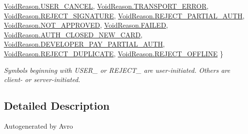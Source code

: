 \begin{DoxyCompactItemize}
\hyperlink{namespacecom_1_1clover_1_1sdk_1_1v3_1_1order_acb5aac0c1f6aeeb5b636223a69d2dec2a59a532f4ef332d10fde273cc7ff4fd14}{Void\+Reason.\+U\+S\+E\+R\+\_\+\+C\+A\+N\+C\+EL}, 
\hyperlink{namespacecom_1_1clover_1_1sdk_1_1v3_1_1order_acb5aac0c1f6aeeb5b636223a69d2dec2aaadf556bd097b61c56920ef42829167a}{Void\+Reason.\+T\+R\+A\+N\+S\+P\+O\+R\+T\+\_\+\+E\+R\+R\+OR}, 
\hyperlink{namespacecom_1_1clover_1_1sdk_1_1v3_1_1order_acb5aac0c1f6aeeb5b636223a69d2dec2a1e9802c7cfdc4f5719f7ce1ae4f3344e}{Void\+Reason.\+R\+E\+J\+E\+C\+T\+\_\+\+S\+I\+G\+N\+A\+T\+U\+RE}, 
\hyperlink{namespacecom_1_1clover_1_1sdk_1_1v3_1_1order_acb5aac0c1f6aeeb5b636223a69d2dec2ad58b4f3e400534658888b0ee3d905924}{Void\+Reason.\+R\+E\+J\+E\+C\+T\+\_\+\+P\+A\+R\+T\+I\+A\+L\+\_\+\+A\+U\+TH}, 
\newline
\hyperlink{namespacecom_1_1clover_1_1sdk_1_1v3_1_1order_acb5aac0c1f6aeeb5b636223a69d2dec2afc0938508402cc60d432d5912ebe6588}{Void\+Reason.\+N\+O\+T\+\_\+\+A\+P\+P\+R\+O\+V\+ED}, 
\hyperlink{namespacecom_1_1clover_1_1sdk_1_1v3_1_1order_acb5aac0c1f6aeeb5b636223a69d2dec2ab9e14d9b2886bcff408b85aefa780419}{Void\+Reason.\+F\+A\+I\+L\+ED}, 
\hyperlink{namespacecom_1_1clover_1_1sdk_1_1v3_1_1order_acb5aac0c1f6aeeb5b636223a69d2dec2ab97459783cb349a6b29deb91651f5489}{Void\+Reason.\+A\+U\+T\+H\+\_\+\+C\+L\+O\+S\+E\+D\+\_\+\+N\+E\+W\+\_\+\+C\+A\+RD}, 
\hyperlink{namespacecom_1_1clover_1_1sdk_1_1v3_1_1order_acb5aac0c1f6aeeb5b636223a69d2dec2aa1d8c654f447ed4f3111c04d22ec1d65}{Void\+Reason.\+D\+E\+V\+E\+L\+O\+P\+E\+R\+\_\+\+P\+A\+Y\+\_\+\+P\+A\+R\+T\+I\+A\+L\+\_\+\+A\+U\+TH}, 
\newline
\hyperlink{namespacecom_1_1clover_1_1sdk_1_1v3_1_1order_acb5aac0c1f6aeeb5b636223a69d2dec2ae925f4c27ce4b14ca5af1560557c2508}{Void\+Reason.\+R\+E\+J\+E\+C\+T\+\_\+\+D\+U\+P\+L\+I\+C\+A\+TE}, 
\hyperlink{namespacecom_1_1clover_1_1sdk_1_1v3_1_1order_acb5aac0c1f6aeeb5b636223a69d2dec2acf063832ea2275f0ae30fefa0de796b5}{Void\+Reason.\+R\+E\+J\+E\+C\+T\+\_\+\+O\+F\+F\+L\+I\+NE}
 \}\begin{DoxyCompactList}\small\item\em Symbols beginning with U\+S\+E\+R\+\_\+ or R\+E\+J\+E\+C\+T\+\_\+ are user-\/initiated. Others are client-\/ or server-\/initiated. \end{DoxyCompactList}
\end{DoxyCompactItemize}


\subsection{Detailed Description}
Autogenerated by Avro

